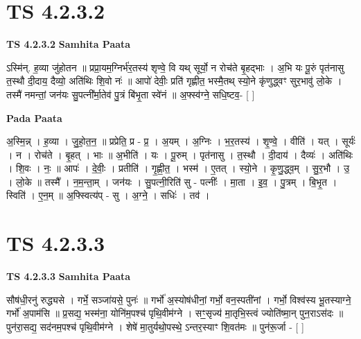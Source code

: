 \documentclass[17pt]{extarticle}
\begin{document}

\section{ TS 4.2.3.2 }

\textbf{TS 4.2.3.2 } \newline
\textbf{Samhita Paata} \newline

ऽस्मि॑न्. ह॒व्या जु॑होतन ॥ प्रप्रा॒यम॒ग्निर्भ॑र॒तस्य॑ शृण्वे॒ वि यथ् सूर्यो॒ न रोच॑ते बृ॒हद्भाः । अ॒भि यः पू॒रुं पृत॑नासु त॒स्थौ दी॒दाय॒ दैव्यो॒ अति॑थिः शि॒वो नः॑ ॥ आपो॑ देवीः॒ प्रति॑ गृह्णीत॒ भस्मै॒तथ् स्यो॒ने कृ॑णुद्ध्वꣳ सुर॒भावु॑ लो॒के । तस्मै॑ नमन्तां॒ जन॑यः सु॒पत्नी᳚र्मा॒तेव॑ पु॒त्रं बि॑भृ॒ता स्वे॑नं ॥ अ॒फ्स्व॑ग्ने॒ सधि॒ष्टव॒- [  ] \newline

\textbf{Pada Paata} \newline

अ॒स्मि॒न्न् । ह॒व्या । जु॒हो॒त॒न॒ ॥ प्रप्रेति॒ प्र - प्र॒ । अ॒यम् । अ॒ग्निः । भ॒र॒तस्य॑ । शृ॒ण्वे॒ । वीति॑ । यत् । सूर्यः॑ । न । रोच॑ते । बृ॒हत् । भाः ॥ अ॒भीति॑ । यः । पू॒रुम् । पृत॑नासु । त॒स्थौ । दी॒दाय॑ । दैव्यः॑ । अति॑थिः । शि॒वः । नः॒ ॥ आपः॑ । दे॒वीः॒ । प्रतीति॑ । गृ॒ह्णी॒त॒ । भस्म॑ । ए॒तत् । स्यो॒ने । कृ॒णु॒द्ध्व॒म् । सु॒र॒भौ । उ॒ । लो॒के ॥ तस्मै᳚ । न॒म॒न्ता॒म् । जन॑यः । सु॒पत्नी॒रिति॑ सु - पत्नीः᳚ । मा॒ता । इ॒व॒ । पु॒त्रम् । बि॒भृ॒त । स्विति॑ । ए॒न॒म् ॥ अ॒फ्स्वित्य॑प् - सु । अ॒ग्ने॒ । सधिः॑ । तव॑ ।  \newline





\section{ TS 4.2.3.3 }

\textbf{TS 4.2.3.3 } \newline
\textbf{Samhita Paata} \newline

सौष॑धी॒रनु॑ रुद्ध्यसे । गर्भे॒ सञ्जा॑यसे॒ पुनः॑ ॥ गर्भो॑ अ॒स्योष॑धीनां॒ गर्भो॒ वन॒स्पती॑नां । गर्भो॒ विश्व॑स्य भू॒तस्याग्ने॒ गर्भो॑ अ॒पाम॑सि ॥ प्र॒सद्य॒ भस्म॑ना॒ योनि॑म॒पश्च॑ पृथि॒वीम॑ग्ने । सꣳ॒॒सृज्य॑ मा॒तृभि॒स्त्वं ज्योति॑ष्मा॒न् पुन॒राऽस॑दः ॥ पुन॑रा॒सद्य॒ सद॑नम॒पश्च॑ पृथि॒वीम॑ग्ने । शेषे॑ मा॒तुर्यथो॒पस्थे॒ ऽन्तर॒स्याꣳ शि॒वत॑मः ॥ पुन॑रू॒र्जा - [  ] \newline
\end{document}
